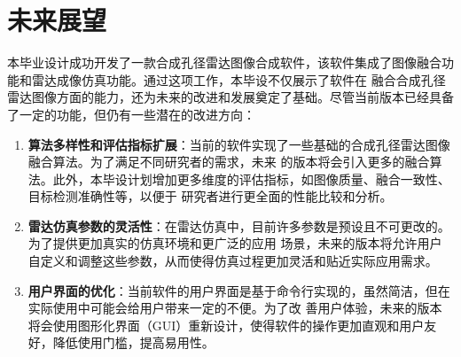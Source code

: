 \documentclass{xduugthesis}
\begin{document}
\section{未来展望}
本毕业设计成功开发了一款合成孔径雷达图像合成软件，该软件集成了图像融合功能和雷达成像仿真功能。通过这项工作，本毕设不仅展示了软件在
融合合成孔径雷达图像方面的能力，还为未来的改进和发展奠定了基础。尽管当前版本已经具备了一定的功能，但仍有一些潜在的改进方向：
\begin{enumerate}
	\item \textbf{算法多样性和评估指标扩展}：当前的软件实现了一些基础的合成孔径雷达图像融合算法。为了满足不同研究者的需求，未来
	的版本将会引入更多的融合算法。此外，本毕设计划增加更多维度的评估指标，如图像质量、融合一致性、目标检测准确性等，以便于
	研究者进行更全面的性能比较和分析。	
	\item \textbf{雷达仿真参数的灵活性}：在雷达仿真中，目前许多参数是预设且不可更改的。为了提供更加真实的仿真环境和更广泛的应用
	场景，未来的版本将允许用户自定义和调整这些参数，从而使得仿真过程更加灵活和贴近实际应用需求。
	\item \textbf{用户界面的优化}：当前软件的用户界面是基于命令行实现的，虽然简洁，但在实际使用中可能会给用户带来一定的不便。为了改
	善用户体验，未来的版本将会使用图形化界面（GUI）重新设计，使得软件的操作更加直观和用户友好，降低使用门槛，提高易用性。
\end{enumerate}
\end{document}

